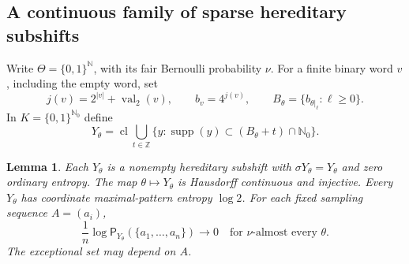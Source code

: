 \documentclass[11pt,reqno]{amsart}
\numberwithin{equation}{section}
\newtheorem{lemma}[theorem]{Lemma}
\theoremstyle{definition}
\newcommand{\N}{\mathbb N}
\newcommand{\Nzero}{\mathbb N_0}
\newcommand{\Patt}{\mathsf P}
\newcommand{\supp}{\operatorname{supp}}
\begin{document}
\subsection{A continuous family of sparse hereditary subshifts}

Write $\Theta=\{0,1\}^{\N}$, with its fair Bernoulli probability
$\nu$. For a finite binary word $v$, including the empty word, set
\[
 j(v)=2^{|v|}+\operatorname{val}_2(v),\qquad
 b_v=4^{j(v)},\qquad
 B_\theta=\{b_{\theta|_\ell}:\ell\ge0\}.
\]
In $K=\{0,1\}^{\Nzero}$ define
\[
 Y_\theta=
 \operatorname{cl}\bigcup_{t\in\mathbb Z}
 \{y:\supp(y)\subset(B_\theta+t)\cap\Nzero\}.
\]

\begin{lemma}\label{lem:sparse-bundle}
Each $Y_\theta$ is a nonempty hereditary subshift with
$\sigma Y_\theta=Y_\theta$ and zero ordinary entropy.
The map $\theta\mapsto Y_\theta$ is Hausdorff continuous and injective.
Every $Y_\theta$ has coordinate maximal-pattern entropy $\log2$.
For each fixed sampling sequence $A=(a_i)$,
\[
 \frac1n\log\Patt_{Y_\theta}(\{a_1,\ldots,a_n\})
 \longrightarrow0
 \quad\text{for }\nu\text{-almost every }\theta.
\]
The exceptional set may depend on $A$.
\end{lemma}
\end{document}
